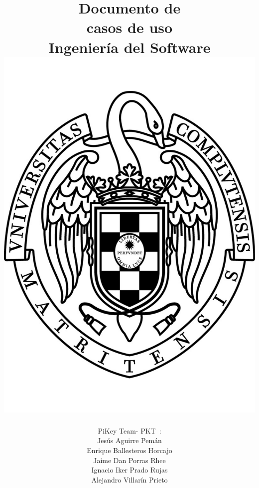\documentclass[spanish,a4paper,11pt, twoside]{report}	%
\newcommand*{\PKT}{\hbox{P}\kern-2.5pt\lower3.5pt\hbox{\small{K}}\kern-2.8pt\hbox{T}\kern-2pt}	%
\begin{document}
\title{\textbf{\huge{Documento de \\ 
	casos de uso}} \\ \vspace{0.3cm}
	\Large{Ingeniería del Software} \\
	\includegraphics[scale=0.3]{ucm.pdf}}
\author{{\Large{PiKey Team-}} \PKT \ : \vspace{0.2cm} \\
	Jesús Aguirre Pemán \\
	 Enrique Ballesteros Horcajo \\
	 Jaime Dan Porras Rhee \\
	 Ignacio Iker Prado Rujas \\
	 Alejandro Villarín Prieto }
\date{\Today}
\maketitle
\end{document}

